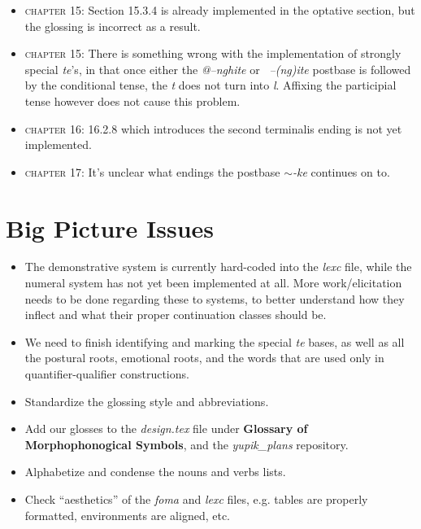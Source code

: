 \documentclass{article}
\begin{document}
\begin{itemize}
\item \textsc{chapter 15}: Section 15.3.4 is already implemented in the optative section, but the glossing is incorrect as a result.

\item \textsc{chapter 15}: There is something wrong with the implementation of strongly special \textit{te}'s, in that once either the \textit{@--nghite} or \textit{~--(ng)ite} postbase is followed by the conditional tense, the \textit{t} does not turn into \textit{l}.
%
Affixing the participial tense however does not cause this problem.

\item \textsc{chapter 16}: 16.2.8 which introduces the second terminalis ending is not yet implemented.

\item \textsc{chapter 17}: It's unclear what endings the postbase \textit{$\sim$-ke} continues on to.

\end{itemize}


\section{Big Picture Issues}

\begin{itemize}
\renewcommand\labelitemi{$\cdot$}

\item The demonstrative system is currently hard-coded into the \textit{lexc} file, while the numeral system has not yet been implemented at all.
%
More work/elicitation needs to be done regarding these to systems, to better understand how they inflect and what their proper continuation classes should be.

\item We need to finish identifying and marking the special \textit{te} bases, as well as all the postural roots, emotional roots, and the words that are used only in quantifier-qualifier constructions.

\item Standardize the glossing style and abbreviations.

\item Add our glosses to the \textit{design.tex} file under \textbf{Glossary of Morphophonogical Symbols}, and the \textit{yupik\_plans} repository.

\item Alphabetize and condense the nouns and verbs lists.

\item Check ``aesthetics'' of the \textit{foma} and \textit{lexc} files, e.g. tables are properly formatted, environments are aligned, etc.

\end{itemize}
\end{document}
